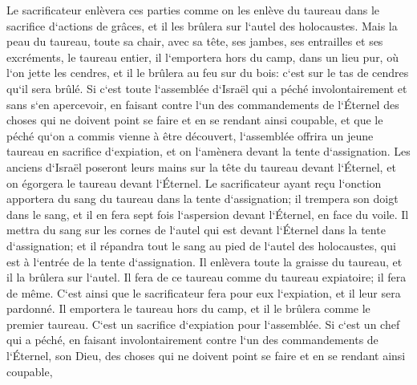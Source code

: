 \verse Le sacrificateur enlèvera ces parties comme on les enlève du taureau dans le sacrifice d`actions de grâces, et il les brûlera sur l`autel des holocaustes. 
\verse Mais la peau du taureau, toute sa chair, avec sa tête, ses jambes, ses entrailles et ses excréments, 
\verse le taureau entier, il l`emportera hors du camp, dans un lieu pur, où l`on jette les cendres, et il le brûlera au feu sur du bois: c`est sur le tas de cendres qu`il sera brûlé. 
\verse Si c`est toute l`assemblée d`Israël qui a péché involontairement et sans s`en apercevoir, en faisant contre l`un des commandements de l`Éternel des choses qui ne doivent point se faire et en se rendant ainsi coupable, 
\verse et que le péché qu`on a commis vienne à être découvert, l`assemblée offrira un jeune taureau en sacrifice d`expiation, et on l`amènera devant la tente d`assignation. 
\verse Les anciens d`Israël poseront leurs mains sur la tête du taureau devant l`Éternel, et on égorgera le taureau devant l`Éternel. 
\verse Le sacrificateur ayant reçu l`onction apportera du sang du taureau dans la tente d`assignation; 
\verse il trempera son doigt dans le sang, et il en fera sept fois l`aspersion devant l`Éternel, en face du voile. 
\verse Il mettra du sang sur les cornes de l`autel qui est devant l`Éternel dans la tente d`assignation; et il répandra tout le sang au pied de l`autel des holocaustes, qui est à l`entrée de la tente d`assignation. 
\verse Il enlèvera toute la graisse du taureau, et il la brûlera sur l`autel. 
\verse Il fera de ce taureau comme du taureau expiatoire; il fera de même. C`est ainsi que le sacrificateur fera pour eux l`expiation, et il leur sera pardonné. 
\verse Il emportera le taureau hors du camp, et il le brûlera comme le premier taureau. C`est un sacrifice d`expiation pour l`assemblée. 
\verse Si c`est un chef qui a péché, en faisant involontairement contre l`un des commandements de l`Éternel, son Dieu, des choses qui ne doivent point se faire et en se rendant ainsi coupable, 
